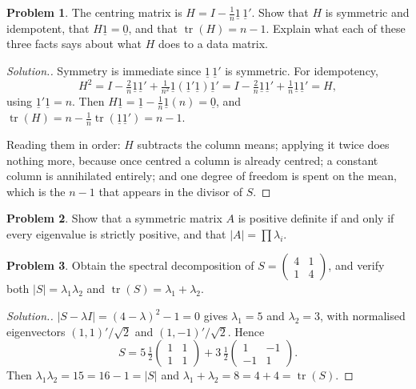 \documentclass[11pt,a4paper]{article}
\theoremstyle{definition}
\newtheorem{problemx}{Problem}[section]
\newenvironment{problem}{\begin{problemx}}{\end{problemx}}
\newenvironment{solution}
  {\renewcommand{\qedsymbol}{}\begin{proof}[\textit{Solution}.]}
  {\end{proof}}
\begin{document}
\begin{problem}
The centring matrix is $H = I - \tfrac{1}{n}\underline{1}\,\underline{1}'$.
Show that $H$ is symmetric and idempotent, that $H\underline{1}=\underline{0}$,
and that $\operatorname{tr}(H) = n-1$. Explain what each of these three facts
says about what $H$ does to a data matrix.
\end{problem}

\begin{solution}
Symmetry is immediate since $\underline{1}\,\underline{1}'$ is symmetric. For
idempotency,
$$H^{2} = I - \tfrac{2}{n}\underline{1}\underline{1}'
+ \tfrac{1}{n^{2}}\underline{1}\left(\underline{1}'\underline{1}\right)\underline{1}'
= I - \tfrac{2}{n}\underline{1}\underline{1}' + \tfrac{1}{n}\underline{1}\underline{1}' = H,$$
using $\underline{1}'\underline{1}=n$. Then
$H\underline{1} = \underline{1}-\tfrac{1}{n}\underline{1}(n) = \underline{0}$,
and $\operatorname{tr}(H) = n - \tfrac{1}{n}\operatorname{tr}(\underline{1}\underline{1}')
= n-1$.

Reading them in order: $H$ subtracts the column means; applying it twice does
nothing more, because once centred a column is already centred; a constant
column is annihilated entirely; and one degree of freedom is spent on the mean,
which is the $n-1$ that appears in the divisor of $S$.
\end{solution}

\begin{problem}
Show that a symmetric matrix $A$ is positive definite if and only if every
eigenvalue is strictly positive, and that $\left|A\right| = \prod\lambda_i$.
\end{problem}

\begin{problem}
Obtain the spectral decomposition of
$S = \begin{pmatrix} 4 & 1\\ 1 & 4\end{pmatrix}$, and verify both
$\left|S\right| = \lambda_1\lambda_2$ and
$\operatorname{tr}(S) = \lambda_1+\lambda_2$.
\end{problem}

\begin{solution}
$\left|S-\lambda I\right| = (4-\lambda)^{2}-1 = 0$ gives $\lambda_1=5$ and
$\lambda_2=3$, with normalised eigenvectors $(1,1)'/\sqrt2$ and
$(1,-1)'/\sqrt2$. Hence
$$S = 5\,\tfrac12\begin{pmatrix}1&1\\1&1\end{pmatrix}
+ 3\,\tfrac12\begin{pmatrix}1&-1\\-1&1\end{pmatrix}.$$
Then $\lambda_1\lambda_2 = 15 = 16-1 = \left|S\right|$ and
$\lambda_1+\lambda_2 = 8 = 4+4 = \operatorname{tr}(S)$.
\end{solution}
\end{document}
